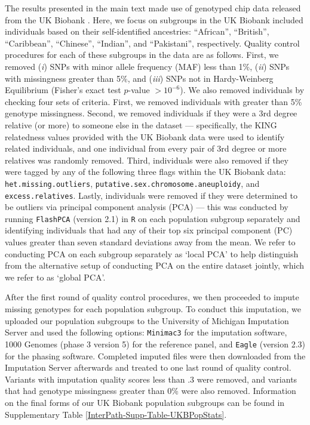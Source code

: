 \documentclass[10pt]{article}
\begin{document}
The results presented in the main text made use of genotyped chip data released from the UK Biobank \cite{Sudlow2015}. Here, we focus on subgroups in the UK Biobank included individuals based on their self-identified ancestries: ``African'', ``British'', ``Caribbean'', ``Chinese'', ``Indian'', and ``Pakistani'', respectively. Quality control procedures for each of these subgroups in the data are as follows. First, we removed (\textit{i}) SNPs with minor allele frequency (MAF) less than 1\%, (\textit{ii}) SNPs with missingness greater than 5\%, and (\textit{iii}) SNPs not in Hardy-Weinberg Equilibrium (Fisher's exact test $p$-value $> 10^{-6}$). We also removed individuals by checking four sets of criteria. First, we removed individuals with greater than 5\% genotype missingness. Second, we removed individuals if they were a 3rd degree relative (or more) to someone else in the dataset --- specifically, the KING relatedness values provided with the UK Biobank data were used to identify related individuals, and one individual from every pair of 3rd degree or more relatives was randomly removed. Third, individuals were also removed if they were tagged by any of the following three flags within the UK Biobank data: \texttt{het.missing.outliers}, \texttt{putative.sex.chromosome.aneuploidy}, and \texttt{excess.relatives}. Lastly, individuals were removed if they were determined to be outliers via principal component analysis (PCA) --- this was conducted by running \texttt{FlashPCA} (version 2.1) \cite{Abraham2017} in \texttt{R} on each population subgroup separately and identifying individuals that had any of their top six principal component (PC) values greater than seven standard deviations away from the mean. We refer to conducting PCA on each subgroup separately as `local PCA' to help distinguish from the alternative setup of conducting PCA on the entire dataset jointly, which we refer to as `global PCA'. 

After the first round of quality control procedures, we then proceeded to impute missing genotypes for each population subgroup. To conduct this imputation, we uploaded our population subgroups to the University of Michigan Imputation Server \cite{Das2016} and used the following options: \texttt{Minimac3} for the imputation software, 1000 Genomes (phase 3 version 5) for the reference panel, and \texttt{Eagle} (version 2.3) for the phasing software. Completed imputed files were then downloaded from the Imputation Server afterwards and treated to one last round of quality control. Variants with imputation quality scores  less than .3 were removed, and variants that had genotype missingness greater than 0\% were also removed. Information on the final forms of our UK Biobank population subgroups can be found in Supplementary Table \ref{InterPath-Supp-Table-UKBPopStats}.
\end{document}
